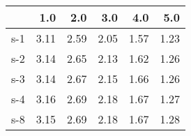 \begin{tabular}{lrrrrr}
\toprule
{} &  1.0 &  2.0 &  3.0 &  4.0 &  5.0 \\
\midrule
s-1 & 3.11 & 2.59 & 2.05 & 1.57 & 1.23 \\
s-2 & 3.14 & 2.65 & 2.13 & 1.62 & 1.26 \\
s-3 & 3.14 & 2.67 & 2.15 & 1.66 & 1.26 \\
s-4 & 3.16 & 2.69 & 2.18 & 1.67 & 1.27 \\
s-8 & 3.15 & 2.69 & 2.18 & 1.67 & 1.28 \\
\bottomrule
\end{tabular}
